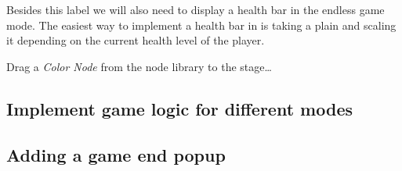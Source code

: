 Besides this label we will also need to display a health bar in the endless game
mode. The easiest way to implement a health bar in \cocos{} is taking a plain
 and scaling it depending on the current health level
of the player.

\begin{leftbar}
Drag a \textit{Color Node} from the node library to the stage\ldots
\end{leftbar}

\subsection{Implement game logic for different modes}

\subsection{Adding a game end popup}

 